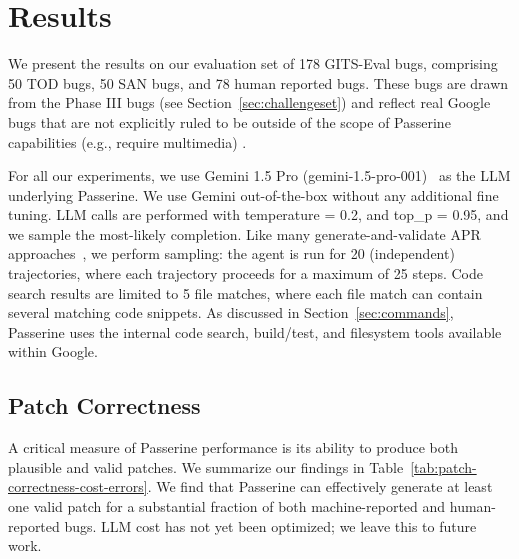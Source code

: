 \section{Results}
\label{sec:results}





We present the results on our evaluation set of 178 GITS-Eval bugs, comprising 50 TOD bugs, 50 SAN bugs, and 78 human reported bugs. These
bugs are drawn from the Phase III bugs (see Section~\ref{sec:challengeset}) and
reflect real Google bugs that are not explicitly ruled to be outside
of the scope of Passerine capabilities (e.g., require multimedia) .


For all our experiments, we use Gemini 1.5 Pro (gemini-1.5-pro-001)~\cite{gemini1point5pro} as the LLM underlying Passerine.
We use Gemini out-of-the-box without any additional fine tuning.
LLM calls are performed with temperature = 0.2, and top\_p = 0.95, and we sample the most-likely completion.
Like many generate-and-validate APR approaches~\cite{aprbib}, we perform sampling: the agent is run for 20 (independent) trajectories, where each trajectory proceeds for a maximum of 25 steps. Code search results are limited to 5 file matches, where each 
file match can contain several matching code snippets. As discussed in Section~\ref{sec:commands},
Passerine uses the internal code search, build/test, and filesystem tools available within Google.





\subsection{Patch Correctness}
A critical measure of Passerine performance is its ability
to produce 
both plausible and valid patches. We summarize our findings in Table~\ref{tab:patch-correctness-cost-errors}.
We find that Passerine can effectively generate at
least one valid patch
for a substantial fraction of both machine-reported and
human-reported bugs.
LLM cost has not yet been optimized; we leave this to future work.
%

\begin{table}[]
\resizebox{\columnwidth}{!}{

}
\caption{Summary of correctness and LLM usage for Passerine repairs.
}
\label{tab:patch-correctness-cost-errors}
\end{table}

